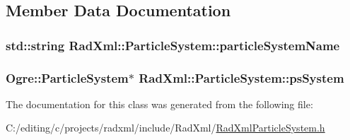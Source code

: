 \subsection{Member Data Documentation}
\hypertarget{class_rad_xml_1_1_particle_system_a59effad5c4966dc5c3c06e1e6fed0e6e}{
\subsubsection[{particle\-System\-Name}]{\setlength{\rightskip}{0pt plus 5cm}std\-::string Rad\-Xml\-::\-Particle\-System\-::particle\-System\-Name}}\label{class_rad_xml_1_1_particle_system_a59effad5c4966dc5c3c06e1e6fed0e6e}
\hypertarget{class_rad_xml_1_1_particle_system_addac63815e4096e91af16be6e4e983b5}{
\subsubsection[{ps\-System}]{\setlength{\rightskip}{0pt plus 5cm}Ogre\-::\-Particle\-System$\ast$ Rad\-Xml\-::\-Particle\-System\-::ps\-System}}\label{class_rad_xml_1_1_particle_system_addac63815e4096e91af16be6e4e983b5}


The documentation for this class was generated from the following file\-:\begin{DoxyCompactItemize}
\item 
C\-:/editing/c/projects/radxml/include/\-Rad\-Xml/\hyperlink{_rad_xml_particle_system_8h}{Rad\-Xml\-Particle\-System.\-h}\end{DoxyCompactItemize}
